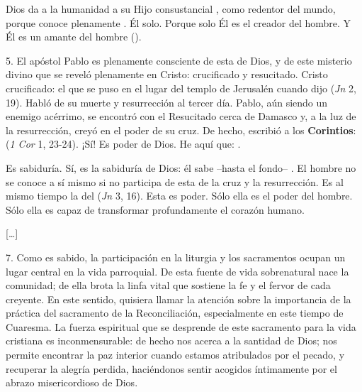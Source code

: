 \begin{body}
Dios da a la humanidad a su Hijo consustancial , como redentor del mundo, porque conoce plenamente . Él solo. Porque solo Él es el creador del hombre. Y Él es un amante del hombre ().

5. El apóstol Pablo es plenamente consciente de esta  de Dios, y de este misterio divino que se reveló plenamente en Cristo: crucificado y resucitado. Cristo crucificado: el que se puso en el lugar del templo de Jerusalén cuando dijo  (\textit{Jn} 2, 19). Habló de su muerte y resurrección al tercer día. Pablo, aún siendo un enemigo acérrimo, se encontró con el Resucitado cerca de Damasco y, a la luz de la resurrección, creyó en el poder de su cruz. De hecho, escribió a los \textbf{Corintios}:  (\textit{1 Cor} 1, 23-24). ¡Sí! Es poder de Dios. He aquí que: .

Es sabiduría. Sí, es la sabiduría de Dios: él sabe –hasta el fondo– . El hombre no se conoce a sí mismo si no participa de esta  de la cruz y la resurrección. Es al mismo tiempo la  del  (\textit{Jn} 3, 16). Esta  es poder. Sólo ella es el poder del hombre. Sólo ella es capaz de transformar profundamente el corazón humano.

[\ldots]

7.  Como es sabido, la participación en la liturgia y los sacramentos ocupan un lugar central en la vida parroquial. De esta fuente de vida sobrenatural nace la comunidad; de ella brota la linfa vital que sostiene la fe y el fervor de cada creyente. En este sentido, quisiera llamar la atención sobre la importancia de la práctica del sacramento de la Reconciliación, especialmente en este tiempo de Cuaresma. La fuerza espiritual que se desprende de este sacramento para la vida cristiana es inconmensurable: de hecho nos acerca a la santidad de Dios; nos permite encontrar la paz interior cuando estamos atribulados por el pecado, y recuperar la alegría perdida, haciéndonos sentir acogidos íntimamente por el abrazo misericordioso de Dios.


\end{body}
